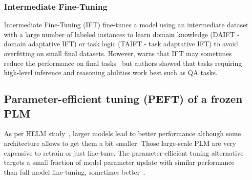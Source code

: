 \documentclass[acmsmall]{acmart}
\begin{document}
\subsubsection{Intermediate Fine-Tuning} 
Intermediate Fine-Tuning (IFT) fine-tunes a model using an intermediate dataset with a large number of labeled instances to learn domain knowledge (DAIFT - domain adaptative IFT) or task logic (TAIFT - task adaptative IFT) to avoid overfitting on small final datasets. However, \citet{kalyanAMMUSSurveyTransformerbased2021} warns that IFT may sometimes reduce the performance on final tasks~\citep{pruksachatkunIntermediateTaskTransferLearning2020} but authors showed that tasks requiring high-level inference and reasoning abilities work best such as QA tasks.

\subsection{Parameter-efficient tuning (PEFT) of a frozen PLM}\label{sec_PETtraining}
As per HELM study~\citep{liangetal.HolisticEvaluationLanguage2022}, larger models lead to better performance although some architecture allows to get them a bit smaller. Those large-scale PLM are very expensive to retrain or just fine-tune. The parameter-efficient tuning alternative targets a small fraction of model parameter update with similar performance than full-model fine-tuning, sometimes better~\citep{dingDeltaTuningComprehensive2022}.
\end{document}
